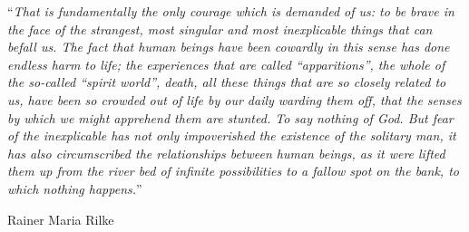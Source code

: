 
\vspace*{0.2\textheight}

\noindent\enquote{\itshape That is fundamentally the only courage which is demanded of us: to be brave in the face of the strangest, most singular and most inexplicable things that can befall us. The fact that human beings have been cowardly in this sense has done endless harm to life; the experiences that are called “apparitions”, the whole of the so-called “spirit world”, death, all these things that are so closely related to us, have been so crowded out of life by our daily warding them off, that the senses by which we might apprehend them are stunted. To say nothing of God. But fear of the inexplicable has not only impoverished the existence of the solitary man, it has also circumscribed the relationships between human beings, as it were lifted them up from the river bed of infinite possibilities to a fallow spot on the bank, to which nothing happens.}\bigbreak

\hfill Rainer Maria Rilke


